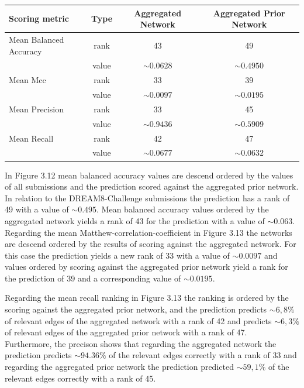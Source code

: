 \begin{table}[H]
\begin{center}
\small
\begin{tabular}{l|c|c|c}
\toprule 
\textbf{Scoring metric} &\textbf{Type} & \textbf{Aggregated Network} & \textbf{Aggregated Prior Network}\\
 \hline\hline
\rowcolor{black!10} Mean Balanced Accuracy & rank & 43 & 49\\
  & value & $\sim 0.0628$ &$\sim 0.4950$\\
\rowcolor{black!10} Mean Mcc & rank & 33 & 39\\
  & value &$ \sim 0.0097$ &$ \sim 0.0195$\\
\rowcolor{black!10} Mean Precision & rank & 33 & 45 \\
 & value & $\sim 0.9436$& $\sim 0.5909$\\
\rowcolor{black!10}Mean Recall & rank & 42 & 47\\
  & value & $\sim 0.0677$ & $\sim 0.0632$\\
\bottomrule
\end{tabular}
\end{center}
\end{table} 

In Figure 3.12 mean balanced accuracy values are descend ordered by the values of all submissions and the prediction scored against the aggregated prior network. In relation to the DREAM8-Challenge submissions the prediction has a rank of 49 with a value of $\sim 0.495$. Mean balanced accuracy values ordered by the aggregated network yields a rank of 43 for the prediction with a value of $\sim 0.063$.\\%
Regarding the mean Matthew-correlation-coefficient in Figure 3.13 the networks are descend ordered by the results of scoring against the aggregated network. For this case the prediction yields a new rank of 33 with a value of $\sim 0.0097$ and values ordered by scoring against the aggregated prior network yield a rank for the prediction of 39 and a corresponding value of $\sim 0.0195$.


Regarding the mean recall ranking in Figure 3.13 the ranking is ordered by the scoring against the aggregated prior network, and the prediction predicts $\sim 6,8\% $ of relevant edges of the aggregated network with a rank of 42 and predicts $\sim 6,3\% $ of relevant edges of the aggregated prior network with a rank of 47.\\ 
Furthermore, the precison shows that regarding the aggregated network the prediction predicts $\sim 94.36\%$ of the relevant edges correctly with a rank of 33 and regarding the aggregated prior network the prediction predicted $\sim 59,1\% $ of the relevant edges correctly with a rank of 45.\\\\ 

